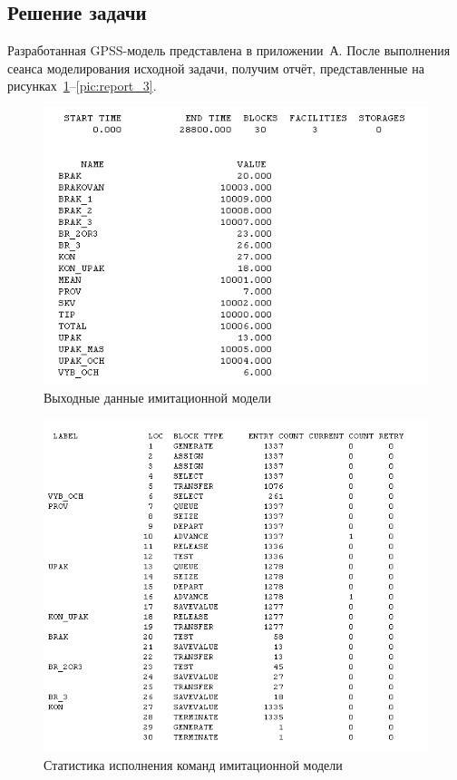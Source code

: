 \subsection{Решение задачи}

Разработанная GPSS-модель представлена в приложении~А. После выполнения сеанса
моделирования исходной задачи, получим отчёт, представленные на
рисунках~\ref{pic:report_1}--\ref{pic:report_3}.

\begin{figure}[h!]
  \centering
  \includegraphics[width=0.7\linewidth]{pic/report_1}
  \caption{Выходные данные имитационной модели}
  \label{pic:report_1}
\end{figure}

\begin{figure}[h!]
  \centering
  \includegraphics[width=0.7\linewidth]{pic/report_2}
  \caption{Статистика исполнения команд имитационной модели}
  \label{pic:report_2}
\end{figure}


